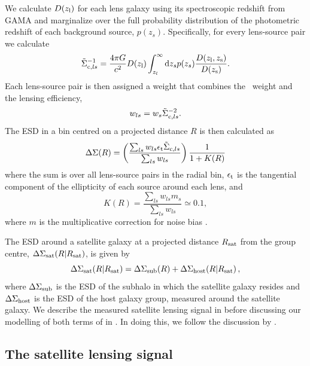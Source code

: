 We calculate $D(z_{\rm l})$ for each lens galaxy using its spectroscopic redshift from GAMA and 
marginalize over the full probability distribution of the photometric redshift of each background 
source, $p(z_s)$. Specifically, for every lens-source pair we calculate
\begin{equation}
 \tilde\Sigma_{{\rm c},ls}^{-1} = \frac{4\pi G}{c^2}D(z_{\rm l}) \int_{z_l}^\infty{\rm 
d}z_sp(z_s)\frac{D(z_{\rm l},z_{\rm s})}{D(z_{\rm s})}.
\end{equation}
Each lens-source pair is then assigned a weight that combines the \lensfit\ weight and the lensing 
efficiency,
\begin{equation}
 w_{ls} = w_s\tilde\Sigma_{{\rm c},ls}^{-2}.
\end{equation}
The ESD in a bin centred on a projected distance $R$ is then calculated as
\begin{equation}
 \Delta\Sigma(R) = \left(\frac{\sum_{ls}w_{ls}\epsilon_{\rm t}\tilde\Sigma_{{\rm c},ls}} 
{\sum_{ls}w_{ls}}\right)\frac1{1+K(R)}
\end{equation}
where the sum is over all lens-source pairs in the radial bin, $\epsilon_{\rm t}$ is the tangential 
component of the ellipticity of each source around each lens, and
\begin{equation}
 K(R) = \frac{\sum_{ls}w_{ls}m_s}{\sum_{ls}w_{ls}} \simeq0.1,
\end{equation}
where $m$ is the multiplicative correction for noise bias \citep{miller13,kuijken15}.

The ESD around a satellite galaxy at a projected distance $R_{\rm sat}$ from the group centre, 
$\Delta\Sigma_{\rm sat}(R \vert R_{\rm sat})$, is given by
\begin{equation}\label{eq:DeltaSigma}
 \Delta\Sigma_{\rm sat}(R \vert R_{\rm sat}) = \Delta\Sigma_{\rm sub}(R) + \Delta\Sigma_{\rm 
host}(R \vert R_{\rm sat})\,,
\end{equation}
where $\Delta\Sigma_{\rm sub}$ is the ESD of the subhalo in which the satellite galaxy resides and 
$\Delta\Sigma_{\rm host}$ is the ESD of the host galaxy group, measured around the satellite 
galaxy. We describe the measured satellite lensing signal in  before discussing our 
modelling of both terms of  in . In doing this, 
we follow the discussion by \cite{yang06}.


\subsection{The satellite lensing signal}\label{s:signal}

